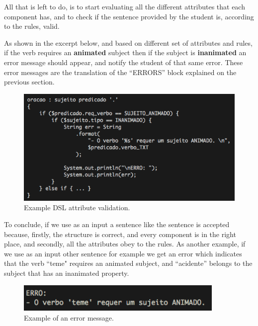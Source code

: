 All that is left to do, is to start evaluating all the different attributes that each component has, and to check if the sentence provided by the student is, according to the rules, valid. 

As shown in the excerpt below, and based on different set of attributes and rules, if the verb requires an \textbf{animated} subject then if the subject is \textbf{inanimated} an error message should appear, and notify the student of that same error. These error messages are the translation of the ``ERRORS'' block explained on the previous section.

\begin{figure}[h]
    \centering
    \includegraphics[width=12cm]{images/dsl_validation.png}
    \caption{Example DSL attribute validation.}
    \label{fig:dsl_attribute_validation}
\end{figure}

To conclude, if we use as an input a sentence like
the sentence is accepted because, firstly, the structure is correct, and every component is in the right place, and secondly, all the attributes obey to the rules. As another example, if we use as an input other sentence for example 
we get an error which indicates that the verb ``teme" requires an animated subject, and ``acidente'' belongs to the subject that has an inanimated property.

\begin{figure}[h]
    \centering
    \includegraphics[width=10cm]{images/animated_subject_error.png}
    \caption{Example of an error message.}
    \label{fig:error_message_dsl}
\end{figure}

